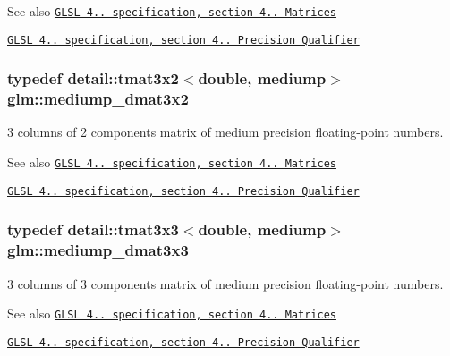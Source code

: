 \begin{DoxySeeAlso}{See also}
\href{http://www.opengl.org/registry/doc/GLSLangSpec.4.20.8.pdf}{\tt G\+L\+SL 4.. specification, section 4.. Matrices} 

\href{http://www.opengl.org/registry/doc/GLSLangSpec.4.20.8.pdf}{\tt G\+L\+SL 4.. specification, section 4.. Precision Qualifier} 
\end{DoxySeeAlso}
\subsubsection[{\texorpdfstring{mediump\+\_\+dmat3x2}{mediump_dmat3x2}}]{\setlength{\rightskip}{0pt plus 5cm}typedef detail\+::tmat3x2$<$double, mediump$>$ {\bf glm\+::mediump\+\_\+dmat3x2}}\hypertarget{group__core__precision_gaff0060984716bcda68ff69ed27536bf6}{}\label{group__core__precision_gaff0060984716bcda68ff69ed27536bf6}
3 columns of 2 components matrix of medium precision floating-\/point numbers.

\begin{DoxySeeAlso}{See also}
\href{http://www.opengl.org/registry/doc/GLSLangSpec.4.20.8.pdf}{\tt G\+L\+SL 4.. specification, section 4.. Matrices} 

\href{http://www.opengl.org/registry/doc/GLSLangSpec.4.20.8.pdf}{\tt G\+L\+SL 4.. specification, section 4.. Precision Qualifier} 
\end{DoxySeeAlso}
\subsubsection[{\texorpdfstring{mediump\+\_\+dmat3x3}{mediump_dmat3x3}}]{\setlength{\rightskip}{0pt plus 5cm}typedef detail\+::tmat3x3$<$double, mediump$>$ {\bf glm\+::mediump\+\_\+dmat3x3}}\hypertarget{group__core__precision_ga2f73508d8192390ca9f9b569f544fade}{}\label{group__core__precision_ga2f73508d8192390ca9f9b569f544fade}
3 columns of 3 components matrix of medium precision floating-\/point numbers.

\begin{DoxySeeAlso}{See also}
\href{http://www.opengl.org/registry/doc/GLSLangSpec.4.20.8.pdf}{\tt G\+L\+SL 4.. specification, section 4.. Matrices} 

\href{http://www.opengl.org/registry/doc/GLSLangSpec.4.20.8.pdf}{\tt G\+L\+SL 4.. specification, section 4.. Precision Qualifier} 
\end{DoxySeeAlso}

